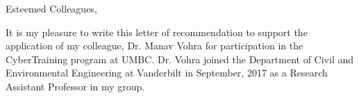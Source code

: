 \documentclass[12pt]{article}
\begin{document}
\thispagestyle{empty}


\noindent Esteemed Colleagues, \vspace{2mm}

It is my pleasure to write this letter of recommendation to support the application of my colleague, Dr. Manav Vohra
for participation in the CyberTraining program at UMBC. Dr. Vohra joined the Department of Civil and Environmental
Engineering at Vanderbilt in September, 2017 as a Research Assistant Professor in my group. 
\end{document}
